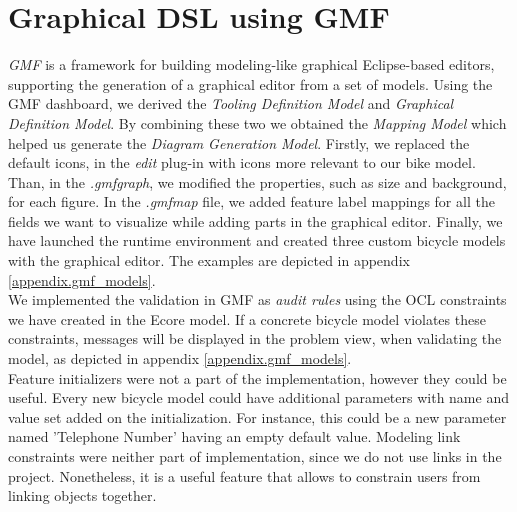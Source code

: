 \section{Graphical DSL using GMF}
\label{sec.gmf}
\noindent \emph{GMF} is a framework for building modeling-like graphical
Eclipse-based editors, supporting the generation of a graphical editor from a
set of models. Using the GMF dashboard, we
derived the \emph{Tooling Definition Model} and \emph{Graphical Definition
Model}. By combining these two we obtained the \emph{Mapping Model} which helped
us generate the \emph{Diagram Generation Model}. Firstly, we replaced the
default icons, in the \emph{edit} plug-in with icons more relevant to our bike model.
Than, in the \emph{.gmfgraph}, we modified the properties, such as size and
background, for each figure. In the \emph{.gmfmap} file, we added feature label
mappings for all the fields we want to visualize while adding parts in the
graphical editor. Finally, we have launched the runtime environment and created
three custom bicycle models with the graphical editor. The examples are depicted
in appendix \ref{appendix.gmf_models}.\\

\noindent We implemented the validation in GMF as \emph{audit rules} using the
OCL constraints we have created in the Ecore model. If a concrete bicycle model
violates these constraints, messages will be displayed in the problem view, when
validating the model, as depicted in appendix \ref{appendix.gmf_models}.\\

\noindent Feature initializers were not a part of the implementation, however
they could be useful. Every new bicycle model could have additional parameters
with name and value set added on the initialization. For instance, this could be
a new parameter named 'Telephone Number' having an empty default value. Modeling
link constraints were neither part of implementation, since we do not use links
in the project. Nonetheless, it is a useful feature that allows to constrain
users from linking objects together.\\
